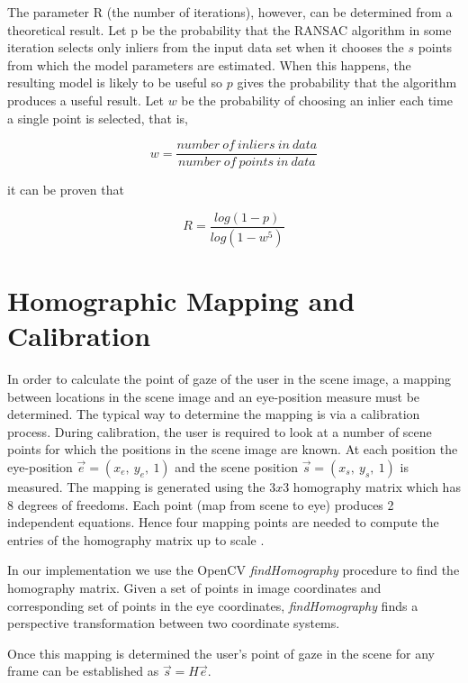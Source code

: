 The parameter R (the number of iterations), however, can be determined from a theoretical result. Let p be the probability that the RANSAC algorithm in some iteration selects only inliers from the input data set when it chooses the $s$ points from which the model parameters are estimated. When this happens, the resulting model is likely to be useful so $p$ gives the probability that the algorithm produces a useful result. Let $w$ be the probability of choosing an inlier each time a single point is selected, that is, 
\begin{dBox}
	$$ w = \frac{number \: of \: inliers \: in \: data}{number \: of \: points \: in \: data} $$
\end{dBox}
it can be proven that 
\begin{dBox}
\begin{equation}
		R = \frac{log(1-p)}{log(1-w^{5})}
\end{equation}
\end{dBox}

\section{Homographic Mapping and Calibration}
In order to calculate the point of gaze of the user in the scene image, a mapping between locations in the scene image and an eye-position measure must be determined. The typical way to determine the mapping is via a calibration process. During calibration, the user is required to look at a number of scene points for which the positions in the scene image are known. At each position the eye-position $\vec{e} = (x_{e} ,\: y_{e},\: 1)$ and the scene position $\vec{s} = (x_{s},\: y_{s},\: 1)$ is measured. The mapping is generated using the $3x3$ homography matrix which has 8 degrees of freedoms. Each point (map from scene to eye) produces 2 independent equations. Hence four mapping points are needed to compute the entries of the homography matrix up to scale \cite{heuristic}. \bigskip

\begin{our}
In our implementation we use the OpenCV \textit{findHomography} procedure to find the homography matrix. Given a set of points in image coordinates and corresponding set of points in the eye coordinates, \textit{findHomography} finds a perspective transformation between two coordinate systems.
\end{our}

Once this mapping is determined the user’s point of gaze in the scene for any frame can be established
as $\vec{s} = H \vec{e}$.
